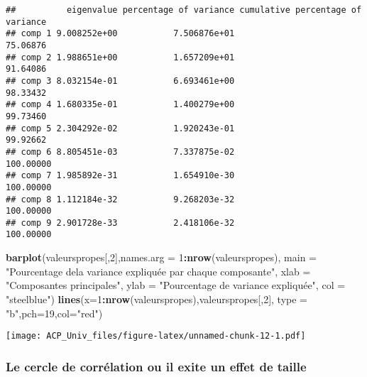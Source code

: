 \documentclass[
]{article}
\newenvironment{Shaded}{\begin{snugshade}}{\end{snugshade}}
\newcommand{\AttributeTok}[1]{\textcolor[rgb]{0.13,0.29,0.53}{#1}}
\newcommand{\DecValTok}[1]{\textcolor[rgb]{0.00,0.00,0.81}{#1}}
\newcommand{\FunctionTok}[1]{\textcolor[rgb]{0.13,0.29,0.53}{\textbf{#1}}}
\newcommand{\NormalTok}[1]{#1}
\newcommand{\OtherTok}[1]{\textcolor[rgb]{0.56,0.35,0.01}{#1}}
\newcommand{\SpecialCharTok}[1]{\textcolor[rgb]{0.81,0.36,0.00}{\textbf{#1}}}
\newcommand{\StringTok}[1]{\textcolor[rgb]{0.31,0.60,0.02}{#1}}
\begin{document}
\begin{Shaded}
\end{Shaded}

\begin{verbatim}
##          eigenvalue percentage of variance cumulative percentage of variance
## comp 1 9.008252e+00           7.506876e+01                          75.06876
## comp 2 1.988651e+00           1.657209e+01                          91.64086
## comp 3 8.032154e-01           6.693461e+00                          98.33432
## comp 4 1.680335e-01           1.400279e+00                          99.73460
## comp 5 2.304292e-02           1.920243e-01                          99.92662
## comp 6 8.805451e-03           7.337875e-02                         100.00000
## comp 7 1.985892e-31           1.654910e-30                         100.00000
## comp 8 1.112184e-32           9.268203e-32                         100.00000
## comp 9 2.901728e-33           2.418106e-32                         100.00000
\end{verbatim}

\begin{Shaded}
\begin{Highlighting}[]
\FunctionTok{barplot}\NormalTok{(valeurspropes[,}\DecValTok{2}\NormalTok{],}\AttributeTok{names.arg =} \DecValTok{1}\SpecialCharTok{:}\FunctionTok{nrow}\NormalTok{(valeurspropes),}
        \AttributeTok{main =} \StringTok{"Pourcentage dela variance expliquée par chaque composante"}\NormalTok{,}
        \AttributeTok{xlab =} \StringTok{"Composantes principales"}\NormalTok{,}
        \AttributeTok{ylab =} \StringTok{"Pourcentage de variance expliquée"}\NormalTok{,}
        \AttributeTok{col =} \StringTok{"steelblue"}\NormalTok{)}
\FunctionTok{lines}\NormalTok{(}\AttributeTok{x=}\DecValTok{1}\SpecialCharTok{:}\FunctionTok{nrow}\NormalTok{(valeurspropes),valeurspropes[,}\DecValTok{2}\NormalTok{],}
      \AttributeTok{type =} \StringTok{"b"}\NormalTok{,}\AttributeTok{pch=}\DecValTok{19}\NormalTok{,}\AttributeTok{col=}\StringTok{"red"}\NormalTok{)}
\end{Highlighting}
\end{Shaded}

\texttt{[image: ACP\_Univ\_files/figure-latex/unnamed-chunk-12-1.pdf]}

\hypertarget{le-cercle-de-corruxe9lation-ou-il-exite-un-effet-de-taille}{%
\subsubsection{Le cercle de corrélation ou il exite un effet de
taille}\label{le-cercle-de-corruxe9lation-ou-il-exite-un-effet-de-taille}}
\end{document}
